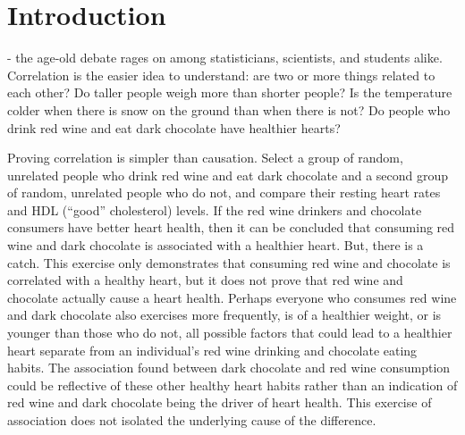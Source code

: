 \chapter{Introduction}
\label{introduction}

 - the age-old debate rages on among statisticians, scientists, and students alike.  Correlation is the easier idea to understand: are two or more things related to each other?  Do taller people weigh more than shorter people?  Is the temperature colder when there is snow on the ground than when there is not?  Do people who drink red wine and eat dark chocolate have healthier hearts? 

Proving correlation is simpler than causation.  Select a group of random, unrelated people who drink red wine and eat dark chocolate and a second group of random, unrelated people who do not, and compare their resting heart rates and HDL (``good'' cholesterol) levels.  If the red wine drinkers and chocolate consumers have better heart health, then it can be concluded that consuming red wine and dark chocolate is associated with a healthier heart.  But, there is a catch.  This exercise only demonstrates that consuming red wine and chocolate is correlated with a healthy heart, but it does not prove that red wine and chocolate actually cause a heart health.  Perhaps everyone who consumes red wine and dark chocolate also exercises more frequently, is of a healthier weight, or is younger than those who do not, all possible factors that could lead to a healthier heart separate from an individual's red wine drinking and chocolate eating habits.  The association found between dark chocolate and red wine consumption could be reflective of these other healthy heart habits rather than an indication of red wine and dark chocolate being the driver of heart health.  This exercise of association does not isolated the underlying cause of the difference. 
 
